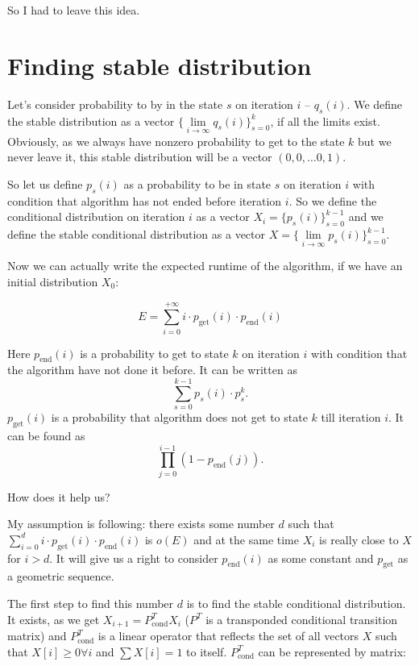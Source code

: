 \documentclass{article}
\begin{document}
So I had to leave this idea.

\section{Finding stable distribution}

Let's consider probability to by in the state $s$ on iteration $i$ -- $q_s(i)$. We define the stable distribution as a vector $\{\lim\limits_{i \to \infty}  q_s(i) \}_{s = 0}^{k}$, if all the limits exist. Obviously, as we always have nonzero probability to get to the state $k$ but we never leave it, this stable distribution will be a vector $(0, 0, \dots 0, 1)$. 

So let us define $p_s(i)$ as a probability to be in state $s$ on iteration $i$ with condition that algorithm has not ended before iteration $i$. So we define the conditional distribution on iteration $i$ as a vector $X_i = \{p_s(i)\}_{s = 0}^{k - 1}$ and we define the stable conditional distribution as a vector $X = \{\lim\limits_{i \to \infty}  p_s(i) \}_{s = 0}^{k - 1}$.

Now we can actually write the expected runtime of the algorithm, if we have an initial distribution $X_0$:

$$E = \sum\limits_{i = 0}^{+\infty} i \cdot p_\text{get}(i) \cdot p_\text{end}(i)$$

Here $p_\text{end}(i)$ is a probability to get to state $k$ on iteration $i$ with condition that the algorithm have not done it before. It can be written as $$\sum\limits_{s = 0}^{k - 1} p_s(i) \cdot p_s^k.$$
$p_\text{get}(i)$ is a probability that algorithm does not get to state $k$ till iteration $i$. It can be found as $$\prod\limits_{j = 0}^{i - 1} (1 - p_\text{end}(j)).$$

How does it help us?

My assumption is following: there exists some number $d$ such that $\sum\limits_{i = 0}^{d} i \cdot p_\text{get}(i) \cdot p_\text{end}(i)$ is $o(E)$ and at the same time $X_i$ is really close to $X$ for $i > d$. It will give us a right to consider $p_\text{end}(i)$ as some constant and $p_\text{get}$ as a geometric sequence.

The first step to find this number $d$ is to find the stable conditional distribution. It exists, as we get $X_{i + 1} = P_\text{cond}^T X_i$ ($P^T$ is a transponded conditional transition matrix) and $P_\text{cond}^T$ is a linear operator that reflects the set of all vectors $X$ such that $X[i] \ge 0 \forall i$ and $\sum X[i] = 1$  to itself. $P_\text{cond}^T$ can be represented by matrix:
\end{document}
